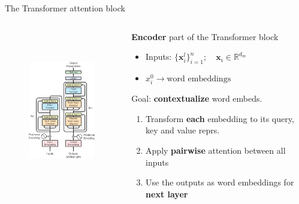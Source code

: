 \documentclass[12pt,aspectratio=169,handout]{beamer}
\begin{document}
\begin{frame}{The Transformer attention block}

	\begin{columns}[T]
	\begin{column}{.48\textwidth}

		\begin{figure}[h]
			\includegraphics[height=7cm]{anno_transformer}
		\end{figure}
		\end{column}
		\begin{column}{.48\textwidth}
			\textbf{Encoder} part of the Transformer block

			\begin{itemize}
				\item Inputs: $\{\bm{x}^l_i\}_{i=1}^n; \quad \bm{x}_i \in \mathbb{R}^{d_m}$
				\item $x^0_i \to \text{word embeddings}$
				\pause 
			\end{itemize}

			Goal: \textbf{contextualize} word embeds.

			\begin{enumerate}
				\pause
				\item Transform \textbf{each} embedding to its query, key and value reprs.
				\pause
				\item Apply \textbf{pairwise} attention between all inputs 
				\pause
				\item Use the outputs as word embeddings for \textbf{next layer} 
			\end{enumerate}
		\end{column}
	\end{columns}
\end{frame}
\end{document}
